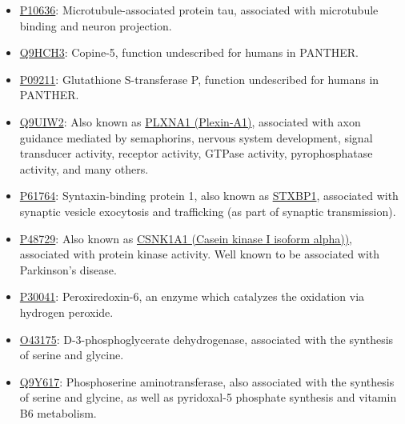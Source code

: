 \begin{itemize}
\item \href{http://www.pantherdb.org/genes/gene.do?acc=HUMAN\%7CHGNC\%3D6893\%7CUniProtKB\%3DP10636}{P10636}: Microtubule-associated protein tau, associated with microtubule binding and neuron projection.
\item \href{http://www.pantherdb.org/genes/gene.do?acc=HUMAN\%7CHGNC\%3D2318\%7CUniProtKB\%3DQ9HCH3}{Q9HCH3}: Copine-5, function undescribed for humans in PANTHER.
\item \href{http://www.pantherdb.org/genes/gene.do?acc=HUMAN\%7CHGNC\%3D4638\%7CUniProtKB\%3DP09211}{P09211}: Glutathione S-transferase P, function undescribed for humans in PANTHER.
\item \href{http://www.pantherdb.org/genes/gene.do?acc=HUMAN\%7CHGNC\%3D9099\%7CUniProtKB\%3DQ9UIW2}{Q9UIW2}: Also known as \href{https://www.uniprot.org/uniprot/Q9UIW2}{PLXNA1 (Plexin-A1)}, associated with axon guidance mediated by semaphorins, nervous system development, signal transducer activity, receptor activity, GTPase activity, pyrophosphatase activity, and many others.
\item \href{http://www.pantherdb.org/genes/gene.do?acc=HUMAN\%7CHGNC\%3D11444\%7CUniProtKB\%3DP61764}{P61764}: Syntaxin-binding protein 1, also known as \href{https://www.uniprot.org/uniprot/P61764}{STXBP1}, associated with synaptic vesicle exocytosis and trafficking (as part of synaptic transmission).
\item \href{http://www.pantherdb.org/genes/gene.do?acc=HUMAN\%7CHGNC\%3D2451\%7CUniProtKB\%3DP48729}{P48729}: Also known as \href{https://www.uniprot.org/uniprot/P48729}{CSNK1A1 (Casein kinase I isoform alpha))}, associated with protein kinase activity. Well known to be associated with Parkinson's disease.
\item \href{http://www.pantherdb.org/genes/gene.do?acc=HUMAN\%7CHGNC\%3D16753\%7CUniProtKB\%3DP30041}{P30041}: Peroxiredoxin-6, an enzyme which catalyzes the oxidation via hydrogen peroxide.
\item \href{http://www.pantherdb.org/genes/gene.do?acc=HUMAN\%7CHGNC\%3D8923\%7CUniProtKB\%3DO43175}{O43175}: D-3-phosphoglycerate dehydrogenase, associated with the synthesis of serine and glycine.
\item \href{http://www.pantherdb.org/genes/gene.do?acc=HUMAN\%7CHGNC\%3D19129\%7CUniProtKB\%3DQ9Y617}{Q9Y617}: Phosphoserine aminotransferase, also associated with the synthesis of serine and glycine, as well as pyridoxal-5 phosphate synthesis and vitamin B6 metabolism.

\end{itemize}

